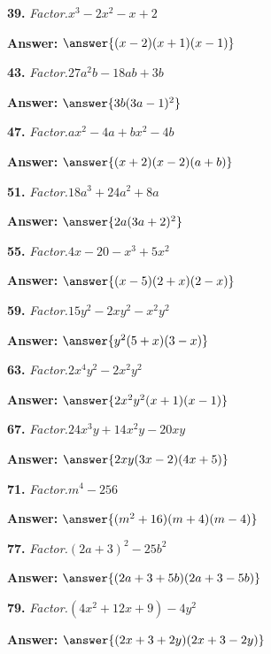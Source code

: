 \documentclass{ximera}
\begin{document}
\begin{problem}
\textbf{39.} \emph{Factor.}\quad $x^3 - 2x^2 - x + 2$

\textbf{Answer:} $\answer{(x -2)(x +1)(x -1)}$
\end{problem}

\begin{problem}
\textbf{43.} \emph{Factor.}\quad $27a^2b - 18ab + 3b$

\textbf{Answer:} $\answer{3b(3a -1)^2}$
\end{problem}

\begin{problem}
\textbf{47.} \emph{Factor.}\quad $ax^2 - 4a + bx^2 - 4b$

\textbf{Answer:} $\answer{(x +2)(x -2)(a +b)}$
\end{problem}

\begin{problem}
\textbf{51.} \emph{Factor.}\quad $18a^3 + 24a^2 + 8a$

\textbf{Answer:} $\answer{2a(3a +2)^2}$
\end{problem}

\begin{problem}
\textbf{55.} \emph{Factor.}\quad $4x - 20 - x^3 + 5x^2$

\textbf{Answer:} $\answer{(x -5)(2 +x)(2 -x)}$
\end{problem}

\begin{problem}
\textbf{59.} \emph{Factor.}\quad $15y^2 - 2xy^2 - x^2y^2$

\textbf{Answer:} $\answer{y^2(5 +x)(3 -x)}$
\end{problem}

\begin{problem}
\textbf{63.} \emph{Factor.}\quad $2x^4y^2 - 2x^2y^2$

\textbf{Answer:} $\answer{2x^2y^2(x +1)(x -1)}$
\end{problem}

\begin{problem}
\textbf{67.} \emph{Factor.}\quad $24x^3y + 14x^2y - 20xy$

\textbf{Answer:} $\answer{2xy(3x -2)(4x +5)}$
\end{problem}

\begin{problem}
\textbf{71.} \emph{Factor.}\quad $m^4 - 256$

\textbf{Answer:} $\answer{(m^2 +16)(m +4)(m -4)}$
\end{problem}

\begin{problem}
\textbf{77.} \emph{Factor.}\quad $(2a + 3)^2 - 25b^2$

\textbf{Answer:} $\answer{(2a +3 +5b)(2a +3 -5b)}$
\end{problem}

\begin{problem}
\textbf{79.} \emph{Factor.}\quad $(4x^2 + 12x + 9) - 4y^2$

\textbf{Answer:} $\answer{(2x +3 +2y)(2x +3 -2y)}$
\end{problem}
\end{document}

